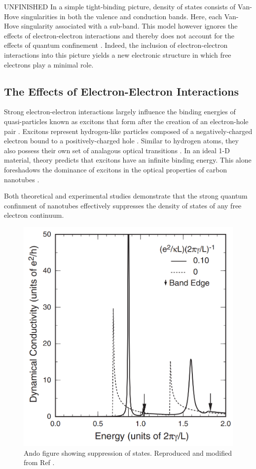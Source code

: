 {\color{red}UNFINISHED} In a simple tight-binding picture, density of states consists of Van-Hove singularities in both the valence and conduction bands. Here, each Van-Hove singularity associated with a sub-band. This model however ignores the effects of electron-electron interactions and thereby does not account for the effects of quantum confinement \cite{weismanKonoBook}. Indeed, the inclusion of electron-electron interactions into this picture yields a new electronic structure in which free electrons play a minimal role.

\subsection{The Effects of Electron-Electron Interactions}
Strong electron-electron interactions largely influence the binding energies of quasi-particles known as excitons that form after the creation of an electron-hole pair \cite{koch2006semiconductor}. Excitons represent hydrogen-like particles composed of a negatively-charged electron bound to a positively-charged hole \cite{koch2006semiconductor}. Similar to hydrogen atoms, they also possess their own set of analagous optical transitions \cite{koch2006semiconductor}. In an ideal 1-D material, theory predicts that excitons have an infinite binding energy. This alone foreshadows the dominance of excitons in the optical properties of carbon nanotubes \cite{ando2005theory}. 

Both theoretical and experimental studies demonstrate that the strong quantum confinment of nanotubes effectively suppresses the density of states of any free electron continuum.  
 
 \begin{figure}[h]
 	\centering
 	\includegraphics[scale=0.4]{images/chapter_optical_props/ando_suppression}
 	\caption{Ando figure showing suppression of states. Reproduced and modified from Ref \cite{ando2005theory}.}
 	\label{fig:ando_suppression}
 \end{figure}

